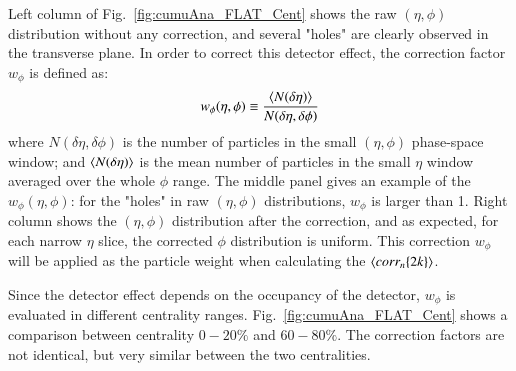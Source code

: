 Left column of Fig.~\ref{fig:cumuAna_FLAT_Cent} shows the raw $(\eta,\phi)$ distribution without any correction, and several "holes" are clearly observed in the transverse plane. In order to correct this detector effect, the correction factor $w_\phi$ is defined as:
\begin{equation}
w_\phi(\eta,\phi)\equiv\frac{\lr{N(\delta\eta)}}{N(\delta\eta,\delta\phi)}
\end{equation}
where $N(\delta\eta,\delta\phi)$ is the number of particles in the small $(\eta,\phi)$ phase-space window; and $\lr{N(\delta\eta)}$ is the mean number of particles in the small $\eta$ window averaged over the whole $\phi$ range. The middle panel gives an example of the $w_\phi(\eta,\phi)$: for the "holes" in raw $(\eta,\phi)$ distributions, $w_\phi$ is larger than 1. Right column shows the $(\eta,\phi)$ distribution after the correction, and as expected, for each narrow $\eta$ slice, the corrected $\phi$ distribution is uniform. This correction $w_{\phi}$ will be applied as the particle weight when calculating the $\left\langle corr_{n}\{2k\}\right\rangle$.

Since the detector effect depends on the occupancy of the detector, $w_\phi$ is evaluated in different centrality ranges. Fig.~\ref{fig:cumuAna_FLAT_Cent} shows a comparison between centrality $0-20\%$ and $60-80\%$. The correction factors are not identical, but very similar between the two centralities.

